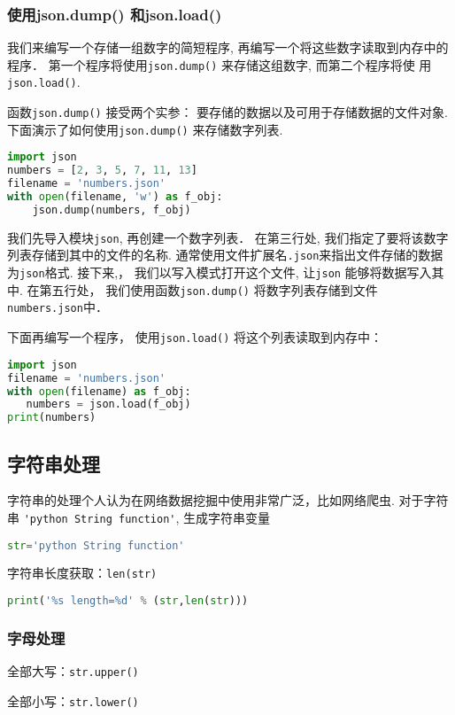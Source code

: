 \subsubsection{使用json.dump() 和json.load()}
我们来编写一个存储一组数字的简短程序, 再编写一个将这些数字读取到内存中的程序． 第一个程序将使用\verb|json.dump()| 来存储这组数字, 而第二个程序将使
用\verb|json.load()|.

函数\verb|json.dump()| 接受两个实参： 要存储的数据以及可用于存储数据的文件对象. 下面演示了如何使用\verb|json.dump()| 来存储数字列表.
\begin{lstlisting}[language=python]
import json
numbers = [2, 3, 5, 7, 11, 13]
filename = 'numbers.json'
with open(filename, 'w') as f_obj:
    json.dump(numbers, f_obj)
\end{lstlisting}
我们先导入模块\verb|json|, 再创建一个数字列表． 在第三行处, 我们指定了要将该数字列表存储到其中的文件的名称. 通常使用文件扩展名\verb|.json|来指出文件存储的数据为\verb|json|格式. 接下来,， 我们以写入模式打开这个文件, 让\verb|json| 能够将数据写入其中. 在第五行处， 我们使用函数\verb|json.dump()| 将数字列表存储到文件\verb|numbers.json|中．

下面再编写一个程序， 使用\verb|json.load()| 将这个列表读取到内存中：

\begin{lstlisting}[language=python]
import json
filename = 'numbers.json'
with open(filename) as f_obj:
   numbers = json.load(f_obj)
print(numbers)
\end{lstlisting}


\subsection{字符串处理}
字符串的处理个人认为在网络数据挖掘中使用非常广泛，比如网络爬虫. 对于字符串 \verb|'python String function'|, 生成字符串变量
\begin{lstlisting}[language=python]
str='python String function'
\end{lstlisting}
字符串长度获取：\verb|len(str)|
\begin{lstlisting}[language=python]
print('%s length=%d' % (str,len(str)))
\end{lstlisting}


\subsubsection{字母处理}
全部大写：\verb|str.upper()|

全部小写：\verb|str.lower()|


